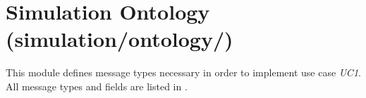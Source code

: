 \section{Simulation Ontology (simulation/ontology/)}
\label{Chapters/Implementation/Simulation-Ontology}
This module defines message types necessary in order to implement use case \textit{UC1}. All message types and fields are listed in .